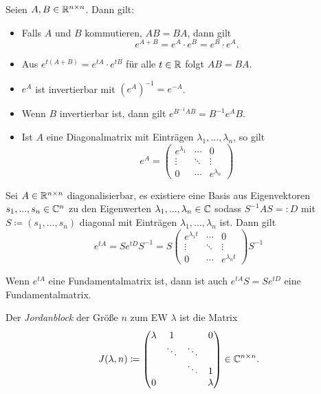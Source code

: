 \documentclass{cheat-sheet}
\begin{document}
\begin{satz}
  Seien $A, B \in \mathbb{R}^{n \times n}$. Dann gilt:
  \begin{itemize}
    \item Falls $A$ und $B$ kommutieren, \dh{} $AB = BA$, dann gilt
    \[ e^{A+B} = e^A \cdot e^B = e^B \cdot e^A. \]
    \item Aus $e^{t(A + B)} = e^{tA} \cdot e^{tB}$ für alle $t \in \mathbb{R}$ folgt $AB = BA$.
    \item $e^{A}$ ist invertierbar mit $(e^A)^{-1} = e^{-A}$.
    \item Wenn $B$ invertierbar ist, dann gilt $e^{B^{-1}AB} = B^{-1} e^A B$.
    \item Ist $A$ eine Diagonalmatrix mit Einträgen $\lambda_1, ..., \lambda_n$, so gilt
    \[ e^A = \begin{pmatrix} e^{\lambda_1} & \cdots & 0 \\ \vdots & \ddots & \vdots \\ 0 & \cdots & e^{\lambda_n} \end{pmatrix} \]
  \end{itemize}
\end{satz}

\begin{satz}
  Sei $A \in \mathbb{R}^{n \times n}$ diagonalisierbar, \dh{} es existiere eine Basis aus Eigenvektoren $s_1, ..., s_n \in \mathbb{C}^n$ zu den Eigenwerten $\lambda_1, ..., \lambda_n \in \mathbb{C}$ sodass $S^{-1} A S =: D$ mit $S \coloneqq (s_1, ..., s_n)$ diagonal mit Einträgen $\lambda_1, ..., \lambda_n$ ist. Dann gilt
  \[ e^{tA} = S e^{tD} S^{-1} = S \begin{pmatrix} e^{\lambda_1 t} & \cdots & 0 \\ \vdots & \ddots & \vdots \\ 0 & \cdots & e^{\lambda_n t} \end{pmatrix} S^{-1} \]
\end{satz}

\begin{bem}
  Wenn $e^{tA}$ eine Fundamentalmatrix ist, dann ist auch $e^{tA} S = S e^{tD}$ eine Fundamentalmatrix.
\end{bem}



\begin{defn}
  Der \emph{Jordanblock} der Größe $n$ zum EW $\lambda$ ist die Matrix
  \[ J(\lambda, n) \coloneqq \begin{pmatrix}
    \lambda & 1 & & 0 \\
    & \ddots & \ddots & \\
    & & \ddots & 1 \\
    0 & & & \lambda
  \end{pmatrix} \in \mathbb{C}^{n \times n}. \]
\end{defn}
\end{document}
